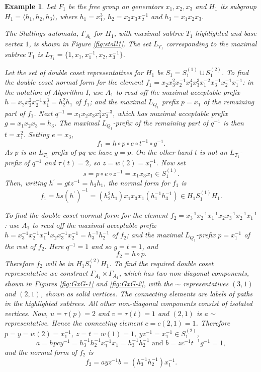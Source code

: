 \documentclass[a4paper,12pt]{article}
\newcommand{\G}{\Gamma }
\renewcommand{\t}{\tau }
\newtheorem{exam}[theorem]{Example}
\newenvironment{example}{\begin{exam} \rm}{\end{exam}}
\numberwithin{equation}{section}
\numberwithin{figure}{section}
\newcommand{\la}{\langle}
\newcommand{\ra}{\rangle}
\begin{document}
\begin{example}\label{ex:f_1}
Let $F_1$ be the free group on generators $x_1,x_2,x_3$ and $H_1$ its
subgroup $H_1=\la
h_1,h_2,h_3\ra$, where  $h_1= x_1^3$, $h_2=x_2x_3x_2^{-1}$ and
$h_3=x_1x_2x_3$.

The Stallings automata, $\G_{A_1}$ for $H_1$,
with maximal subtree $T_1$ highlighted and base vertex $1$, is shown
in Figure %
 \ref{fig:stall1}.
The set $L_{T_1}$ corresponding to the maximal subtree  $T_1$ is
 $L_{T_1}=\{1,x_1,x_1^{-1},x_2,x_3^{-1} \}$.

Let the set of double coset representatives for $H_1$ be $S_1=S_1^{(1)}
\cup S_1^{(2)}$.
To find the double coset normal form for the element $f_1 =
x_2x_3^2x_2^{-1} x_1^4x_3^3x_1^{-2}x_3^{-1}x_2^{-1}x_1^{-1}$: in
the notation of Algorithm I, use
${A_1}$ to read off the maximal acceptable prefix $h=x_2x_3^2x_2^{-1} x_1^3
=h_2^2h_1$
of $f_1$; and
the maximal $L_{Q_1}$ prefix $p=x_1$ of the remaining part of $f_1$. Next
$q^{-1}=x_1x_2x_3x_1^2x_3^{-3}$, which has maximal acceptable prefix
$g=x_1x_2x_3=h_3$. The maximal $L_{Q_1}$-prefix of the remaining part of $q^{-1}$
is then $t=x_1^2$. Setting $e=x_3$,
\[f_1=h\circ p\circ e\circ t^{-1}\circ g^{-1}.\]
As $p$ is an $L_{T_1}$-prefix of $pq$ we have $y=p$. On the other hand
$t$ is not an $L_{T_1}$-prefix of $q^{-1}$ and $\t(t)=2$, so $z=w(2)=x_1^{-1}$.
Now set
\[s=p\circ e\circ z^{-1}=x_1x_3x_1\in S_1^{(1)}.\]
Then, writing $h^\prime=gtz^{-1}=h_3h_1$, the normal form for $f_1$ is
\[f_1=hs(h^\prime)^{-1}=(h_2^{2}h_1) x_1x_3x_1(h_1^{-1}h_3^{-1})\in H_1S_1^{(1)}H_1.\]

To find the double coset normal form for the element
$f_2=x_3^{-1}x_2^{-1}x_1^{-1}x_2x_3^{-1}x_2^{-1}x_1^{-1}$: use
${A_1}$ to read off the maximal acceptable prefix 
$h=x_3^{-1}x_2^{-1}x_1^{-1}x_2x_3^{-1}x_2^{-1}=h_3^{-1}h_2^{-1}$
of $f_2$; 
and  the
maximal $L_{Q_1}$-prefix $p=x_1^{-1}$ of the rest of $f_2$.  Here 
$q^{-1}=1$ and so $g=t=1$, and 
\[f_2=h\circ p.\]
Therefore $f_2$ will be in $H_1S_1^{(2)}H_1$. To find the required
double coset representative we construct $\G_{A_1}\times
\G_{A_1}$, which has two non-diagonal components, shown in Figures
\ref{fig:GxG-1} and \ref{fig:GxG-2},
with the $\sim$ representatives $(3,1)$ and $(2,1)$,  shown as
solid vertices. The connecting elements are labels of paths in the
highlighted subtrees.  All other non-diagonal components consist
of isolated vertices. Now, $u=\t(p)=2$ and $v=\t(t)=1$ and $(2,1)$
is a $\sim$ representative. Hence the  connecting element
$c=c(2,1)=1$. Therefore $p=y=w(2)=x_1^{-1}$, $z=t=w(1)=1$,
$yz^{-1}=x_1^{-1}\in S_1^{(2)}$,
\[a=hpcy^{-1}=h_3^{-1}h_2^{-1}x_1^{-1}x_1=h_3^{-1}h_2^{-1} 
\textrm{ and } 
b=zc^{-1}t^{-1}g^{-1}=1,\]
and the normal form of $f_2$ is
\[f_2=a yz^{-1} b=(h_3^{-1}h_2^{-1}) x_1^{-1}.\]
\end{example}
\end{document}
